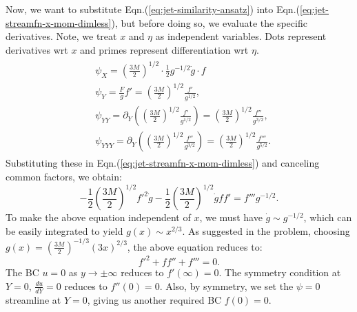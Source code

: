 \documentclass{article}
\begin{document}
Now, we want to substitute Eqn.(\ref{eq:jet-similarity-ansatz}) into Eqn.(\ref{eq:jet-streamfn-x-mom-dimless}), but before doing so, we evaluate the specific derivatives. Note, we treat $x$ and $\eta$ as independent variables. Dots represent derivatives wrt $x$ and primes represent differentiation wrt $\eta$. 
\begin{align}
 \begin{split}
  & \psi_{X} = \left(\frac{3M}{2}\right)^{1/2} \cdot \frac{1}{2} g^{-1/2} \dot{g} \cdot f\\
  & \psi_{Y} = \frac{F}{g} f' =  \left(\frac{3M}{2}\right)^{1/2} \frac{f'}{g^{1/2}},\\
  & \psi_{YY} = \partial_{Y}\left(\left(\frac{3M}{2}\right)^{1/2} \frac{f'}{g^{1/2}} \right) =\left(\frac{3M}{2}\right)^{1/2} \frac{f''}{g^{3/2}},\\
  & \psi_{YYY} = \partial_{Y}\left(\left(\frac{3M}{2}\right)^{1/2} \frac{f''}{g^{3/2}} \right) = \left(\frac{3M}{2}\right)^{1/2} \frac{f'''}{g^{5/2}}.
 \end{split}
\end{align}
Substituting these in Eqn.(\ref{eq:jet-streamfn-x-mom-dimless}) and canceling common factors, we obtain:
\begin{equation}
 -\frac{1}{2} \left(\frac{3M}{2}\right)^{1/2} f'^{2} \dot{g} - \frac{1}{2}\left(\frac{3M}{2}\right)^{1/2} \dot{g} f f' = f''' g^{-1/2}.
\end{equation}
%
To make the above equation independent of $x$, we must have $\dot{g} \sim g^{-1/2}$, which can be easily integrated to yield $\boxed{g(x) \sim x^{2/3} }$. As suggested in the problem, choosing $\boxed{ g(x) = \left(\frac{3M}{2}\right)^{-1/3}(3x)^{2/3} }$, the above equation reduces to:
\begin{equation}\label{eq:f-eqn}
 f'^{2} + f f'' + f''' = 0.
\end{equation}
%
The BC $u =0$ as $y \rightarrow \pm \infty$ reduces to $\boxed{f'(\infty) = 0}$. The symmetry condition at $Y=0$, $\frac{du}{dY} = 0$ reduces to $\boxed{f''(0) = 0}$. Also, by symmetry, we set the $\psi = 0$ streamline at $Y=0$, giving us another required BC $\boxed{f(0) = 0}$. 
\end{document}
